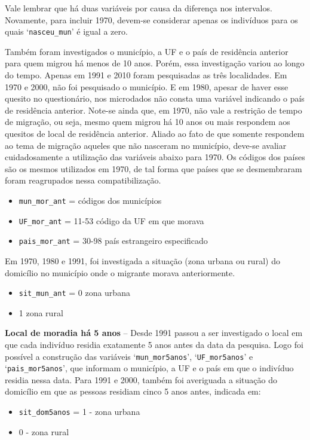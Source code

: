 \documentclass[12pt,a4paper]{article}
\newcommand{\vr}[1]{\texttt{#1}}
\begin{document}
Vale lembrar que há duas variáveis por causa da diferença nos intervalos. Novamente, para incluir 1970, devem-se considerar apenas os indivíduos para os quais ‘\vr{nasceu\_mun}’ é igual a zero.

Também foram investigados o município, a UF e o país de residência anterior para quem migrou há menos de 10 anos. Porém, essa investigação variou ao longo do tempo. Apenas em 1991 e 2010 foram pesquisadas as três localidades. Em 1970 e 2000, não foi pesquisado o município. E em 1980, apesar de haver esse quesito no questionário, nos microdados não consta uma variável indicando o país de residência anterior. Note-se ainda que, em 1970, não vale a restrição de tempo de migração, ou seja, mesmo quem migrou há 10 anos ou mais respondem aos quesitos de local de residência anterior. Aliado ao fato de que somente respondem ao tema de migração aqueles que não nasceram no município, deve-se avaliar cuidadosamente a utilização das variáveis abaixo para 1970. Os códigos dos países são os mesmos utilizados em 1970, de tal forma que países que se desmembraram foram reagrupados nessa compatibilização.
\begin{itemize}
  \item \vr{mun\_mor\_ant} = códigos dos municípios
  \item \vr{UF\_mor\_ant} = 11-53 código da UF em que morava
  \item \vr{pais\_mor\_ant} = 30-98 país estrangeiro especificado
\end{itemize}

Em 1970, 1980 e 1991, foi investigada a situação (zona urbana ou rural) do domicílio no município onde o migrante morava anteriormente.
\begin{itemize}
  \item \vr{sit\_mun\_ant} = 0 zona urbana
  \item 1 zona rural
\end{itemize}

\textbf{Local de moradia há 5 anos} -- Desde 1991 passou a ser investigado o local em que cada indivíduo residia exatamente 5 anos antes da data da pesquisa. Logo foi possível a construção das variáveis ‘\vr{mun\_mor5anos}’, ‘\vr{UF\_mor5anos}’ e ‘\vr{pais\_mor5anos}’, que informam o município, a UF e o país em que o indivíduo residia nessa data. Para 1991 e 2000, também foi averiguada a situação do domicílio em que as pessoas residiam cinco 5 anos antes, indicada em:
\begin{itemize}
  \item \vr{sit\_dom5anos} = 1 - zona urbana
  \item 0 - zona rural
\end{itemize}
\end{document}
